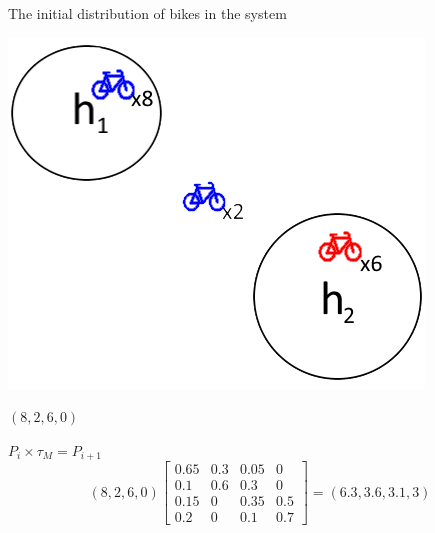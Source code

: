 \begin{frame}{}
	
\begin{center}
The initial distribution of bikes in the system

\includegraphics[scale=0.7]{graphics/initialworld}
	
$ (8,2,6,0) $
\end{center}
\end{frame}

\begin{frame}
	
\begin{center}	
	
$ P_i \times \tau_M = P_{i+1}$\\
		
		
$$
(8, 2, 6, 0)
\begin{bmatrix}
0.65 & 0.3 & 0.05 & 0\\
0.1  & 0.6 & 0.3  & 0\\
0.15 & 0   & 0.35 & 0.5\\
0.2  & 0   & 0.1  & 0.7
\end{bmatrix}
=
(6.3, 3.6, 3.1, 3)
$$
\end{center}
\end{frame}
